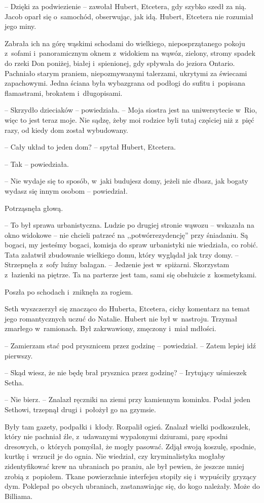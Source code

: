 \documentclass[oneside,polish,11pt,sfheadings]{mwbk}
\begin{document}
-- Dzięki za podwiezienie -- zawołał Hubert, Etcetera, gdy szybko szedł za
nią. Jacob oparł się o~samochód, obserwując, jak idą. Hubert, Etcetera
nie rozumiał jego miny.

Zabrała ich na górę wąskimi schodami do wielkiego, nieposprzątanego
pokoju z~sofami i~panoramicznym oknem z~widokiem na wąwóz, zielony,
stromy spadek do rzeki Don poniżej, białej i~spienionej, gdy spływała do
jeziora Ontario. Pachniało starym praniem, niepozmywanymi talerzami,
ukrytymi za świecami zapachowymi. Jedna ściana była wybazgrana od
podłogi do sufitu i~popisana flamastrami, brokatem i~długopisami.

-- Skrzydło dzieciaków -- powiedziała. -- Moja siostra jest na
uniwersytecie w~Rio, więc to jest teraz moje. Nie sądzę, żeby moi
rodzice byli tutaj częściej niż z~pięć razy, od kiedy dom został
wybudowany.

-- Cały układ to jeden dom? -- spytał Hubert, Etcetera.

-- Tak -- powiedziała.

-- Nie wydaje się to sposób, w~jaki budujesz domy, jeżeli nie dbasz, jak
bogaty wydasz się innym osobom -- powiedział.

Potrząsnęła głową. 

-- To był sprawa urbanistyczna. Ludzie po drugiej
stronie wąwozu -- wskazała na okno widokowe -- nie chcieli patrzeć na
,,potwór\dywiz rezydencję'' przy śniadaniu. Są bogaci, my jesteśmy bogaci,
komisja do spraw urbanistyki nie wiedziała, co robić. Tata załatwił
zbudowanie wielkiego domu, który wyglądał jak trzy domy. -- Strzepnęła z~sofy luźny bałagan. -- Jedzenie jest w~spiżarni. Skorzystam z~łazienki na
piętrze. Ta na parterze jest tam, sami się obsłużcie z~kosmetykami. 

Poszła po schodach i~zniknęła za rogiem.

Seth wyszczerzył się znacząco do Huberta, Etcetera, cichy komentarz na
temat jego romantycznych uczuć do Natalie. Hubert nie był w~nastroju.
Trzymał zmarłego w~ramionach. Był zakrwawiony, zmęczony i~miał mdłości.

-- Zamierzam stać pod prysznicem przez godzinę -- powiedział. -- Zatem
lepiej idź pierwszy.

-- Skąd wiesz, że nie będę brał prysznica przez godzinę? -- Irytujący
uśmieszek Setha.

-- Nie bierz. -- Znalazł ręczniki na ziemi przy kamiennym kominku. Podał
jeden Sethowi, trzepnął drugi i~położył go na gzymsie.

Były tam gazety, podpałki i~kłody. Rozpalił ogień. Znalazł wielki
podkoszulek, który nie pachniał źle, z~udawanymi wypalonymi dziurami,
parę spodni dresowych, o~których pomyślał, że mogły pasować. Zdjął swoją
koszulę, spodnie, kurtkę i~wrzucił je do ognia. Nie wiedział, czy
kryminalistyka mogłaby zidentyfikować krew na ubraniach po praniu, ale
był pewien, że jeszcze mniej zrobią z~popiołem. Tkane powierzchnie
interfejsu stopiły się i~wypuściły gryzący dym. Poklepał po obcych
ubraniach, zastanawiając się, do kogo należały. Może do Billiama.
\end{document}
